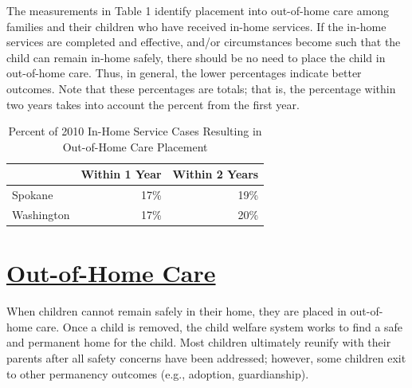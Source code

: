 \documentclass{article}\usepackage[]{graphicx}\usepackage[]{color}
\begin{document}
The measurements in Table 1 identify placement into out-of-home care among families and their children who have received in-home services. If the in-home services are completed and effective, and/or circumstances become such that the child can remain in-home safely, there should be no need to place the child in out-of-home care. Thus, in general, the lower percentages indicate better outcomes. Note that these percentages are totals; that is, the percentage within two years takes into account the percent from the first year.
\vspace{12pt}
\begin{table}[ht]
\centering
\caption{Percent of 2010 In-Home Service Cases Resulting in Out-of-Home Care Placement} 
\begin{tabular}{lrr}
  \toprule
 & Within 1 Year & Within 2 Years \\ 
  \midrule
Spokane & 17\% & 19\% \\ 
  Washington & 17\% & 20\% \\ 
   \bottomrule
\end{tabular}
\end{table}



\newpage
\section{\href{http://www.partnersforourchildren.org/child-well-being/visualizations/out-home-care/trends}
    {Out-of-Home Care}
}
When children cannot remain safely in their home, they are placed in out-of-home care. Once a child is removed, the child welfare system works to find a safe and permanent home for the child. Most children ultimately reunify with their parents after all safety concerns have been addressed; however, some children exit to other permanency outcomes (e.g., adoption, guardianship).\\[6pt]

\label{p:ooh}
\end{document}
